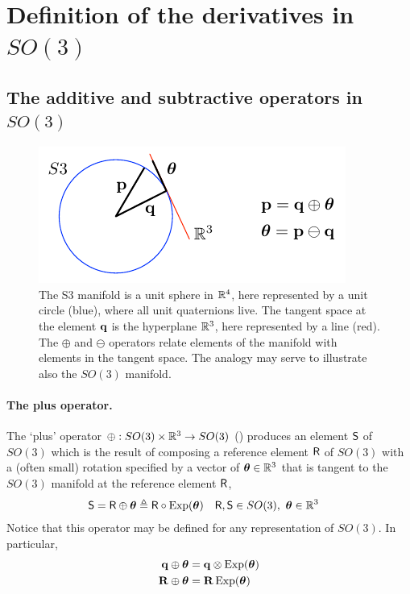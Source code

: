 
\appendices

\section{Definition of the derivatives in $SO(3)$}
\label{sec:derivatives_SO3}

\subsection{The additive and subtractive operators in $SO(3)$}

\begin{figure}[tb]
\begin{center}
\includegraphics{figures/manifold}
\caption{The S3 manifold is a unit sphere in ${\mathbb R}^4$, here represented by a unit circle (blue),  where all unit quaternions live. The tangent space at the element ${\bf q}$ is the hyperplane ${\mathbb R}^3$, here represented by a line (red). The $\oplus$ and $\ominus$ operators relate elements of the manifold with elements in the tangent space. The analogy may serve to illustrate also the $SO(3)$ manifold.}
\label{fig:manifold}
\end{center}
\end{figure}



\paragraph{The plus operator.}
The `plus' operator $\oplus:SO(3)\times{\mathbb R}^3\to SO(3)$ () produces an element $\mathsf S$ of $SO(3)$ which is the result of composing a reference element $\mathsf R$ of $SO(3)$ with a (often small) rotation specified by a vector of ${{\bm \theta}}\in{\mathbb R}^3$ that is tangent to the $SO(3)$ manifold at the reference element $\mathsf R$,
%
\begin{align}
\mathsf S = \mathsf R\oplus {{\bm \theta}} &\triangleq \mathsf R\circ\operatorname*{Exp}({{\bm \theta}}) && \mathsf R,\mathsf S\in SO(3),~ {{\bm \theta}}\in{\mathbb R}^3 
\end{align}
%
Notice that this operator may be defined for any representation of $SO(3)$. In particular, 
%
\begin{align}
{\bf q}\oplus{{\bm \theta}} &= {\bf q}\otimes\operatorname*{Exp}({{\bm \theta}}) \\
{\bf R}\oplus {{\bm \theta}} &= {\bf R}\operatorname*{Exp}({{\bm \theta}}) 
\end{align}

